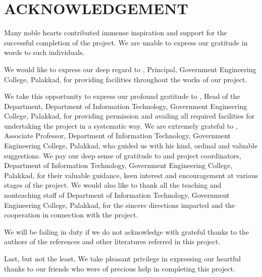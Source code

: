 \chapter*{\centering ACKNOWLEDGEMENT}

Many noble hearts contributed immense inspiration and support for the successful completion of the project. We are unable to express our gratitude in words to such individuals.

We would like to express our deep regard to \cPrincipal, Principal, Government Engineering College, Palakkad, for providing facilities throughout the works of our project. 

We take this opportunity to express our profound gratitude to \cHod, Head of the Department, Department of Information Technology, Government Engineering College, Palakkad, for providing permission and availing all required facilities for undertaking the project in a systematic way. We are extremely grateful to \cGuide, Associate Professor, Department of Information Technology, Government Engineering College, Palakkad, who guided us with his kind, ordinal and valuable suggestions. We pay our deep sense of gratitude to \cCordOne and \cCordTwo project coordinators, Department of Information Technology, Government Engineering College, Palakkad, for their valuable guidance, keen interest and encouragement at various stages of the project. We would also like to thank all the teaching and nonteaching staff of Department of Information Technology, Government Engineering College, Palakkad, for the sincere directions imparted and the cooperation in connection with the project. 

We will be failing in duty if we do not acknowledge with grateful thanks to the authors of the references and other literatures referred in this project. 

Last, but not the least, We take pleasant privilege in expressing our heartful thanks to our friends who were of precious help in completing this project.    